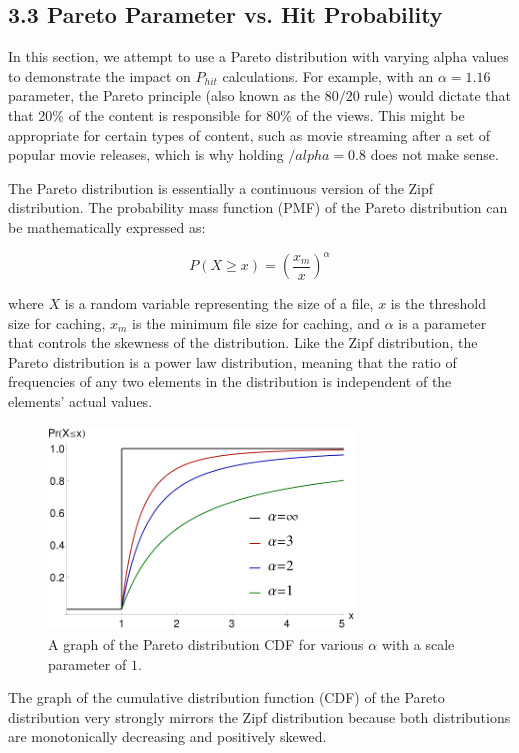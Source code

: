 \documentclass[
	a4paper, %
	10pt, %
	unnumberedsections, %
	twoside, %
]{LTJournalArticle}
\begin{document}
\subsection{3.3 Pareto Parameter vs. Hit Probability}

In this section, we attempt to use a Pareto distribution with varying alpha values to demonstrate the impact on $P_{hit}$ calculations. For example, with an $\alpha = 1.16$ parameter, the Pareto principle (also known as the $80/20$ rule) would dictate that that 20\% of the content is responsible for 80\% of the views. This might be appropriate for certain types of content, such as movie streaming after a set of popular movie releases, which is why holding $/alpha = 0.8$ does not make sense. 

The Pareto distribution is essentially a continuous version of the Zipf distribution. The probability mass function (PMF) of the Pareto distribution can be mathematically expressed as:

\[
    P(X \geq x) = \left(\frac{x_m}{x}\right)^\alpha
\]

where $X$ is a random variable representing the size of a file, $x$ is the threshold size for caching, $x_m$ is the minimum file size for caching, and $\alpha$ is a parameter that controls the skewness of the distribution. Like the Zipf distribution, the Pareto distribution is a power law distribution, meaning that the ratio of frequencies of any two elements in the distribution is independent of the elements' actual values.  

\begin{figure}[h]
	\begin{center}
		\includegraphics[width=8.1cm]{pareto.png}
	\end{center}
	\caption{A graph of the Pareto distribution CDF for various $\alpha$ with a scale parameter of $1$.}	
\end{figure}

The graph of the cumulative distribution function (CDF) of the Pareto distribution very strongly mirrors the Zipf distribution because both distributions are monotonically decreasing and positively skewed. 
\end{document}
